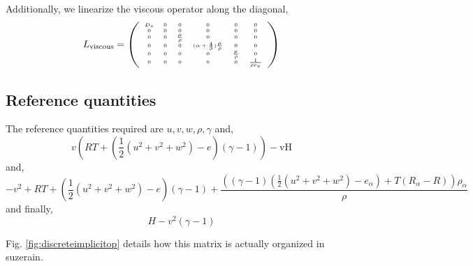 Additionally, we linearize the viscous operator along the diagonal,
\begin{equation}
\tiny
L_{\text{viscous}} = 
\left(
\begin{array}{cccccc}
 D_s & 0 & 0 & 0 & 0 & 0 \\
 0 & 0 & 0 & 0 & 0 & 0 \\
 0 & 0 & \frac{\mu}{\rho} & 0 & 0 & 0 \\
 0 & 0 & 0 & (\alpha+\frac{4}{3})\frac{\mu}{\rho} & 0 & 0 \\
 0 & 0 & 0 & 0 & \frac{\mu}{\rho} & 0 \\
 0 & 0 & 0 & 0 & 0 & \frac{1}{\rho c_v} \\
\end{array}
\right)
\end{equation}

\subsection{Reference quantities}
The reference quantities required are $u,v,w,\rho,\gamma$ and,
\begin{equation}
v \left(R T+\left(\frac{1}{2} \left(u^2+v^2+w^2\right)-e\right) (\gamma -1)\right)-\text{vH}
\end{equation}
and,
\begin{equation}
-v^2+R T+\left(\frac{1}{2} \left(u^2+v^2+w^2\right)-e\right) (\gamma -1)+\frac{\left((\gamma -1) \left(\frac{1}{2} \left(u^2+v^2+w^2\right)-e_{\alpha }\right)+T
   \left(R_{\alpha }-R\right)\right) \rho _{\alpha }}{\rho }
\end{equation}
and finally,
\begin{equation}
H-v^2 (\gamma -1)
\end{equation}

Fig. \ref{fig:discreteimplicitop} details how this matrix is actually organized in
suzerain. 

